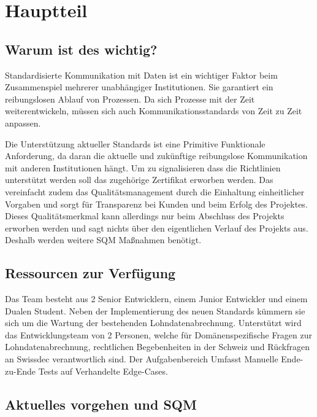 \chapter{Hauptteil}

\section{Warum ist des wichtig?}

Standardisierte Kommunikation mit Daten ist ein wichtiger Faktor beim Zusammenspiel mehrerer unabhängiger Institutionen. Sie garantiert ein reibungslosen Ablauf von Prozessen.
Da sich Prozesse mit der Zeit weiterentwickeln, müssen sich auch Kommunikationsstandards von Zeit zu Zeit anpassen. 

Die Unterstützung aktueller Standards ist eine Primitive Funktionale Anforderung, da daran die aktuelle und zukünftige reibungslose Kommunikation mit anderen Institutionen hängt.
Um zu signalisieren dass die Richtlinien unterstützt werden soll das zugehörige Zertifikat erworben werden. Das vereinfacht zudem das Qualitätsmanagement durch die Einhaltung einheitlicher Vorgaben und sorgt für Transparenz bei Kunden und beim Erfolg des Projektes.
Dieses Qualitätsmerkmal kann allerdings nur beim Abschluss des Projekts erworben werden und sagt nichts über den eigentlichen Verlauf des Projekts aus. Deshalb werden weitere SQM Maßnahmen benötigt.

\section{Ressourcen zur Verfügung}

Das Team besteht aus 2 Senior Entwicklern, einem Junior Entwickler und einem Dualen Student. Neben der Implementierung des neuen Standards kümmern sie sich um die Wartung der bestehenden Lohndatenabrechnung.
 Unterstützt wird das Entwicklungsteam von 2 Personen, welche für Domänenspezifische Fragen zur Lohndatenabrechnung, rechtlichen Begebenheiten in der Schweiz und Rückfragen an Swissdec verantwortlich sind. Der Aufgabenbereich Umfasst Manuelle Ende-zu-Ende Tests auf Verhandelte Edge-Cases.

\section{Aktuelles vorgehen und SQM}

